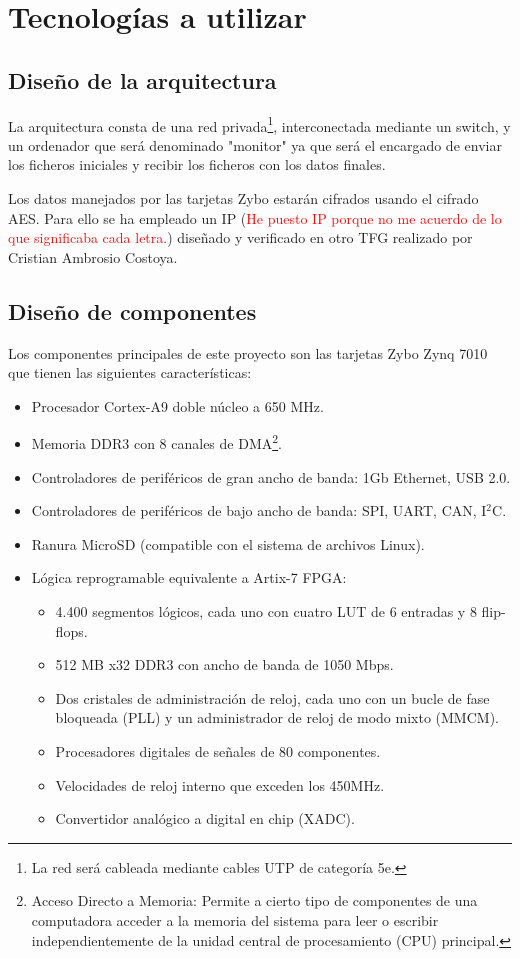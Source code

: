 \section{Tecnologías a utilizar}
\subsection{Diseño de la arquitectura}
La arquitectura consta de una red privada\footnote{La red será cableada mediante cables UTP de categoría 5e.}, interconectada mediante un switch, y un ordenador que será denominado "monitor" ya que será el encargado de enviar los ficheros iniciales y recibir los ficheros con los datos finales.

Los datos manejados por las tarjetas Zybo estarán cifrados usando el cifrado AES. Para ello se ha empleado un IP (\textcolor{red}{He puesto IP porque no me acuerdo de lo que significaba cada letra.}) diseñado y verificado en otro TFG realizado por Cristian Ambrosio Costoya.

\subsection{Diseño de componentes}
Los componentes principales de este proyecto son las tarjetas Zybo Zynq 7010 que tienen las siguientes características:
\begin{itemize}
	\item Procesador Cortex-A9 doble núcleo a 650 MHz.
	\item Memoria DDR3 con 8 canales de DMA\footnote{Acceso Directo a Memoria: Permite a cierto tipo de componentes de una computadora acceder a la memoria del sistema para leer o escribir independientemente de la unidad central de procesamiento (CPU) principal.}.
	\item Controladores de periféricos de gran ancho de banda: 1Gb Ethernet, USB 2.0.
	\item Controladores de periféricos de bajo ancho de banda: SPI, UART, CAN, I$^2$C.
	\item Ranura MicroSD (compatible con el sistema de archivos Linux).
	\item Lógica reprogramable equivalente a Artix-7 FPGA:
	\begin{itemize}
		\item 4.400 segmentos lógicos, cada uno con cuatro LUT de 6 entradas y 8 flip-flops.
		\item 512 MB x32 DDR3 con ancho de banda de 1050 Mbps.
		\item Dos cristales de administración de reloj, cada uno con un bucle de fase bloqueada (PLL) y un administrador de reloj de modo mixto (MMCM).
		\item Procesadores digitales de señales de 80 componentes.
		\item Velocidades de reloj interno que exceden los 450MHz.
		\item Convertidor analógico a digital en chip (XADC).
	\end{itemize}
\end{itemize}

